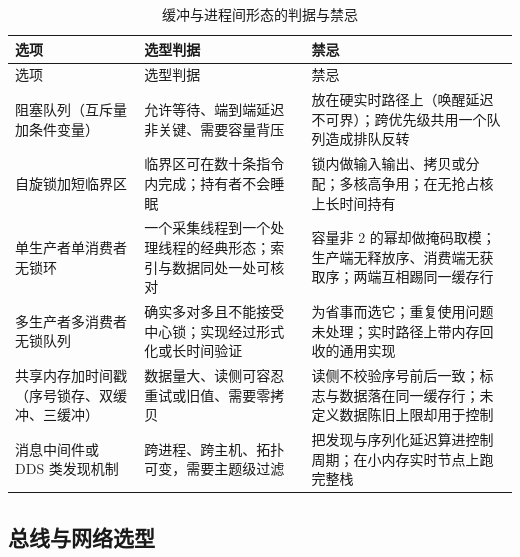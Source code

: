 \documentclass[12pt,a4paper,fontset=fandol]{ctexbook}
\begin{document}
\begin{longtable}{>{\raggedright\arraybackslash\footnotesize}p{}>{\raggedright\arraybackslash\footnotesize}p{}>{\raggedright\arraybackslash\footnotesize}p{}}
\caption{缓冲与进程间形态的判据与禁忌}\label{tab:apC-ipc} \\
\toprule
选项 & 选型判据 & 禁忌 \\
\midrule
\endfirsthead
\toprule
选项 & 选型判据 & 禁忌 \\
\midrule
\endhead
\bottomrule
\endfoot
\endlastfoot
阻塞队列（互斥量加条件变量） & 允许等待、端到端延迟非关键、需要容量背压 & 放在硬实时路径上（唤醒延迟不可界）；跨优先级共用一个队列造成排队反转 \\
自旋锁加短临界区 & 临界区可在数十条指令内完成；持有者不会睡眠 & 锁内做输入输出、拷贝或分配；多核高争用；在无抢占核上长时间持有 \\
单生产者单消费者无锁环 & 一个采集线程到一个处理线程的经典形态；索引与数据同处一处可核对 & 容量非 2 的幂却做掩码取模；生产端无释放序、消费端无获取序；两端互相踢同一缓存行 \\
多生产者多消费者无锁队列 & 确实多对多且不能接受中心锁；实现经过形式化或长时间验证 & 为省事而选它；重复使用问题未处理；实时路径上带内存回收的通用实现 \\
共享内存加时间戳（序号锁存、双缓冲、三缓冲） & 数据量大、读侧可容忍重试或旧值、需要零拷贝 & 读侧不校验序号前后一致；标志与数据落在同一缓存行；未定义数据陈旧上限却用于控制 \\
消息中间件或 DDS 类发现机制 & 跨进程、跨主机、拓扑可变，需要主题级过滤 & 把发现与序列化延迟算进控制周期；在小内存实时节点上跑完整栈 \\
\end{longtable}

\subsection{总线与网络选型}
\end{document}
